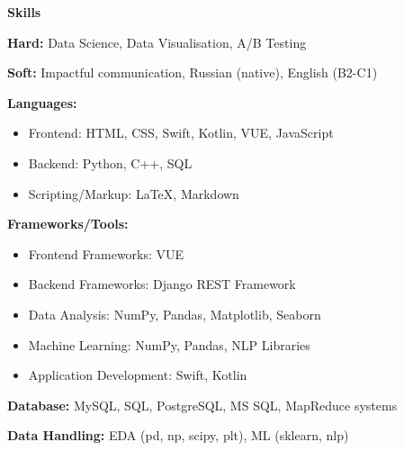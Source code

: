 \begin{center}
    \textbf{Skills}
\end{center}

\textbf{Hard:} Data Science, Data Visualisation, A/B Testing

\textbf{Soft:} Impactful communication, Russian (native), English (B2-C1)

\textbf{Languages:}
\begin{itemize}[noitemsep, topsep=0pt, partopsep=0pt, parsep=0pt]
    \item Frontend: HTML, CSS, Swift, Kotlin, VUE, JavaScript
    \item Backend: Python, C++, SQL
    \item Scripting/Markup: LaTeX, Markdown
\end{itemize}

\textbf{Frameworks/Tools:}
\begin{itemize}[noitemsep, topsep=0pt, partopsep=0pt, parsep=0pt]
    \item Frontend Frameworks: VUE
    \item Backend Frameworks: Django REST Framework
    \item Data Analysis: NumPy, Pandas, Matplotlib, Seaborn
    \item Machine Learning: NumPy, Pandas, NLP Libraries
    \item Application Development: Swift, Kotlin
\end{itemize}

\textbf{Database:} MySQL, SQL, PostgreSQL, MS SQL, MapReduce systems

\textbf{Data Handling:} EDA (pd, np, scipy, plt), ML (sklearn, nlp)
